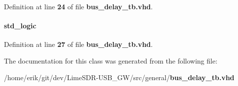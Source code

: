 Definition at line {\bf 24} of file {\bf bus\+\_\+delay\+\_\+tb.\+vhd}.

\paragraph[{reset\+\_\+n}]{ {\bfseries \textcolor{comment}{std\+\_\+logic}\textcolor{vhdlchar}{ }} \hspace{0.3cm}{\ttfamily [Signal]}}\label{classbusy__delay__tb_1_1tb__behave_a1f070fd63a3a7fa45c907335ea870c5b}


Definition at line {\bf 27} of file {\bf bus\+\_\+delay\+\_\+tb.\+vhd}.



The documentation for this class was generated from the following file\+:\begin{DoxyCompactItemize}
\item 
/home/erik/git/dev/\+Lime\+S\+D\+R-\/\+U\+S\+B\+\_\+\+G\+W/src/general/{\bf bus\+\_\+delay\+\_\+tb.\+vhd}\end{DoxyCompactItemize}
